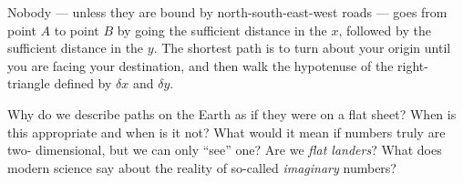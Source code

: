 

Nobody --- unless they are bound by north-south-east-west roads --- goes from
point $A$ to point $B$ by going the sufficient distance in the $x$, followed by the
sufficient distance in the $y$.  The shortest path is to turn about your origin until
you are facing your destination, and then walk the hypotenuse of the right-triangle
defined by $\delta x$ and $\delta y$.

Why do we describe paths on the Earth as if they were on a flat sheet?  When is this 
appropriate and when is it not?  What would it mean if numbers truly are two-
dimensional, but we can only ``see'' one?  Are we \textit{flat landers}?  What does
modern science say about the reality of so-called \textit{imaginary} numbers?



\newpage
\chapterminitoc



\newpage
{}
\noindent{}

\newpage
